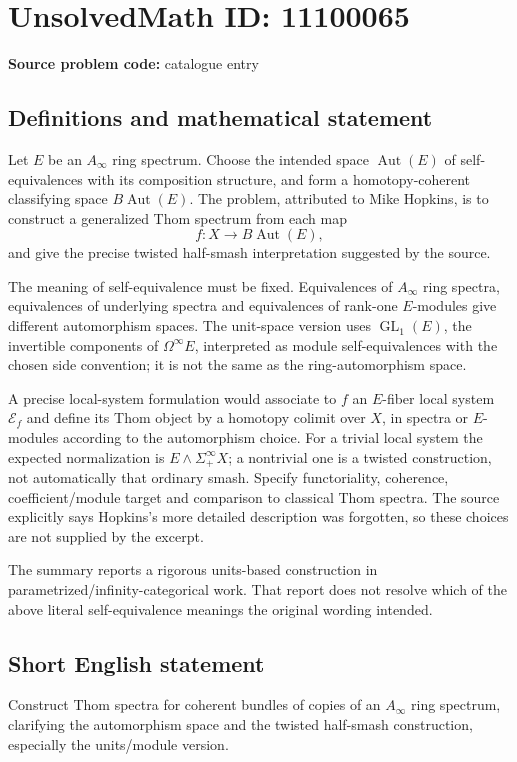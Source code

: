 \documentclass[11pt]{article}
\begin{document}
\section*{UnsolvedMath ID: 11100065}
\textbf{Source problem code:} catalogue entry
\subsection{Definitions and mathematical statement}
Let \(E\) be an \(A_\infty\) ring spectrum. Choose the intended space \(\operatorname{Aut}(E)\) of self-equivalences with its composition structure, and form a homotopy-coherent classifying space \(B\operatorname{Aut}(E)\). The problem, attributed to Mike Hopkins, is to construct a generalized Thom spectrum from each map
\[
 f:X\longrightarrow B\operatorname{Aut}(E),
\]
and give the precise twisted half-smash interpretation suggested by the source.

The meaning of self-equivalence must be fixed. Equivalences of \(A_\infty\) ring spectra, equivalences of underlying spectra and equivalences of rank-one \(E\)-modules give different automorphism spaces. The unit-space version uses \(\operatorname{GL}_1(E)\), the invertible components of \(\Omega^\infty E\), interpreted as module self-equivalences with the chosen side convention; it is not the same as the ring-automorphism space.

A precise local-system formulation would associate to \(f\) an \(E\)-fiber local system \(\mathcal E_f\) and define its Thom object by a homotopy colimit over \(X\), in spectra or \(E\)-modules according to the automorphism choice. For a trivial local system the expected normalization is \(E\wedge\Sigma^\infty_+X\); a nontrivial one is a twisted construction, not automatically that ordinary smash. Specify functoriality, coherence, coefficient/module target and comparison to classical Thom spectra. The source explicitly says Hopkins's more detailed description was forgotten, so these choices are not supplied by the excerpt.

The summary reports a rigorous units-based construction in parametrized/infinity-categorical work. That report does not resolve which of the above literal self-equivalence meanings the original wording intended.
\subsection{Short English statement}
Construct Thom spectra for coherent bundles of copies of an \(A_\infty\) ring spectrum, clarifying the automorphism space and the twisted half-smash construction, especially the units/module version.
\end{document}
